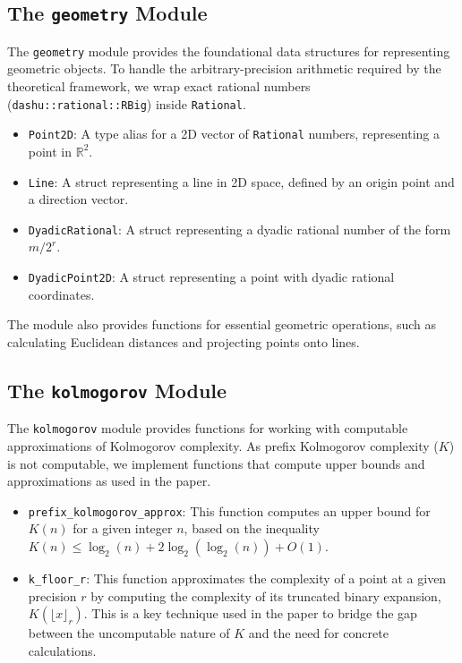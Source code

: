 \documentclass{article}
\begin{document}
\subsection{The \texttt{geometry} Module}

The \texttt{geometry} module provides the foundational data structures for representing geometric objects. To handle the arbitrary-precision arithmetic required by the theoretical framework, we wrap exact rational numbers (\texttt{dashu::rational::RBig}) inside \texttt{Rational}.

\begin{itemize}
    \item \texttt{Point2D}: A type alias for a 2D vector of \texttt{Rational} numbers, representing a point in $\mathbb{R}^2$.
    \item \texttt{Line}: A struct representing a line in 2D space, defined by an origin point and a direction vector.
    \item \texttt{DyadicRational}: A struct representing a dyadic rational number of the form $m/2^r$.
    \item \texttt{DyadicPoint2D}: A struct representing a point with dyadic rational coordinates.
\end{itemize}

The module also provides functions for essential geometric operations, such as calculating Euclidean distances and projecting points onto lines.

\subsection{The \texttt{kolmogorov} Module}

The \texttt{kolmogorov} module provides functions for working with computable approximations of Kolmogorov complexity. As prefix Kolmogorov complexity ($K$) is not computable, we implement functions that compute upper bounds and approximations as used in the paper.

\begin{itemize}
    \item \texttt{prefix\_kolmogorov\_approx}: This function computes an upper bound for $K(n)$ for a given integer $n$, based on the inequality $K(n) \le \log_2(n) + 2\log_2(\log_2(n)) + O(1)$.
    \item \texttt{k\_floor\_r}: This function approximates the complexity of a point at a given precision $r$ by computing the complexity of its truncated binary expansion, $K(\lfloor x \rfloor_r)$. This is a key technique used in the paper to bridge the gap between the uncomputable nature of $K$ and the need for concrete calculations.
\end{itemize}
\end{document}
